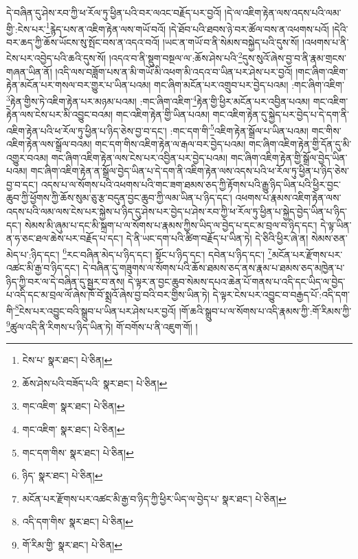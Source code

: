 དེ་བཞིན་དུ་ཤེས་རབ་ཀྱི་ཕ་རོལ་ཏུ་ཕྱིན་པའི་བར་ལའང་བརྗོད་པར་བྱའོ། །དེ་ལ་འཇིག་རྟེན་ལས་འདས་པའི་ལམ་གྱི་:ངེས་པར་\footnote{ངེས་པ་  སྣར་ཐང་།  པེ་ཅིན། }རྙེད་པས་ན་འཇིག་རྟེན་ལས་གཡོ་བའོ། །དེ་ཐོབ་པའི་ཐབས་ཉེ་བར་ཚོལ་བས་ན་འཕགས་པའོ། །དེའི་བར་ཆད་ཀྱི་ཆོས་ཡོངས་སུ་སྤོང་བས་ན་འདའ་བའོ། །ཡང་ན་གཡོ་བ་ནི་སེམས་བསྐྱེད་པའི་དུས་སོ། །འཕགས་པ་ནི་ངེས་པར་འབྱེད་པའི་ཆའི་དུས་སོ། །འདའ་བ་ནི་སྡུག་བསྔལ་ལ་:ཆོས་ཤེས་པའི་\footnote{ཆོས་ཤེས་པའི་བཟོད་པའི་  སྣར་ཐང་།  པེ་ཅིན། }དུས་སུའོ་ཞེས་བྱ་བ་ནི་རྣམ་གྲངས་གཞན་ཡིན་ནོ། །འདི་ལས་བཟློག་པས་ན་མི་གཡོ་མི་འཕག་མི་འདའ་བ་ཡིན་པར་ཤེས་པར་བྱའོ། །གང་ཞིག་འཇིག་རྟེན་མངོན་པར་གསལ་བར་གྱུར་པ་ཡིན་པའམ། གང་ཞིག་མངོན་པར་འགྲུབ་པར་བྱེད་པའམ། :གང་ཞིག་འཇིག་\footnote{གང་འཇིག་  སྣར་ཐང་།  པེ་ཅིན། }རྟེན་གྱིས་ཏེ་འཇིག་རྟེན་པར་མཉམ་པའམ། :གང་ཞིག་འཇིག་\footnote{གང་འཇིག་  སྣར་ཐང་།  པེ་ཅིན། }རྟེན་གྱི་ཕྱིར་མངོན་པར་འབྱིན་པའམ། གང་འཇིག་རྟེན་ལས་ངེས་པར་མི་འབྱུང་བའམ། གང་འཇིག་རྟེན་གྱི་ཡིན་པའམ། གང་འཇིག་རྟེན་དུ་སྐྱེད་པར་བྱེད་པ་དེ་དག་ནི་འཇིག་རྟེན་པའི་ཕ་རོལ་ཏུ་ཕྱིན་པ་ཉིད་ཅེས་བྱ་བ་དང་། :གང་དག་གི་\footnote{གང་དག་གིས་  སྣར་ཐང་།  པེ་ཅིན། }འཇིག་རྟེན་སྒྲོལ་པ་ཡིན་པའམ། གང་གིས་འཇིག་རྟེན་ལས་སྒྲོལ་བའམ། གང་དག་གིས་འཇིག་རྟེན་ལ་རྒལ་བར་བྱེད་པའམ། གང་ཞིག་འཇིག་རྟེན་གྱི་དོན་དུ་མི་འགྱུར་བའམ། གང་ཞིག་འཇིག་རྟེན་ལས་ངེས་པར་འབྱིན་པར་བྱེད་པའམ། གང་ཞིག་འཇིག་རྟེན་གྱི་སྒྲོལ་བྱེད་ཡིན་པའམ། གང་ཞིག་འཇིག་རྟེན་ན་སྒྲོལ་བྱེད་ཡིན་པ་དེ་དག་ནི་འཇིག་རྟེན་ལས་འདས་པའི་ཕ་རོལ་ཏུ་ཕྱིན་པ་ཉིད་ཅེས་བྱ་བ་དང་། འདས་པ་ལ་སོགས་པའི་འཕགས་པའི་གང་ཟག་ཐམས་ཅད་ཀྱི་རྟོགས་པའི་རྒྱུ་ཉིད་ཡིན་པའི་ཕྱིར་བྱང་ཆུབ་ཀྱི་ཕྱོགས་ཀྱི་ཆོས་སུམ་ཅུ་རྩ་བདུན་བྱང་ཆུབ་ཀྱི་ལམ་ཡིན་པ་ཉིད་དང་། འཕགས་པ་རྣམས་འཇིག་རྟེན་ལས་འདས་པའི་ལམ་ལས་ངེས་པར་སྐྱེས་པ་ཉིད་དུ་ཤེས་པར་བྱེད་པ་ཤེས་རབ་ཀྱི་ཕ་རོལ་ཏུ་ཕྱིན་པ་སྐྱེད་བྱེད་ཡིན་པ་ཉིད་དང་། སེམས་མི་ཞུམ་པ་དང་མི་སྐྲག་པ་ལ་སོགས་པ་རྣམས་ཀྱིས་ཡིད་ལ་བྱེད་པ་དང་མ་བྲལ་བ་ཉིད་དང་། དེ་ལྟ་ཡིན་ན་ཧ་ཅང་ཐལ་ཆེས་པར་བརྗོད་པ་དང་། དེ་ནི་ཡང་དག་པའི་ཚིག་བརྗོད་པ་ཡིན་ཏེ། དེ་ཅིའི་ཕྱིར་ཞེ་ན། སེམས་ཅན་མེད་པ་:ཉིད་དང་། \footnote{ཉིད་  སྣར་ཐང་།  པེ་ཅིན། }རང་བཞིན་མེད་པ་ཉིད་དང་། སྟོང་པ་ཉིད་དང་། དབེན་པ་ཉིད་དང་། \footnote{མངོན་པར་རྫོགས་པར་འཚང་མི་རྒྱ་བ་ཉིད་ཀྱི་ཕྱིར་ཡིད་ལ་བྱེད་པ་  སྣར་ཐང་།  པེ་ཅིན། }མངོན་པར་རྫོགས་པར་འཚང་མི་རྒྱ་བ་ཉིད་དང་། དེ་བཞིན་དུ་གཟུགས་ལ་སོགས་པའི་ཆོས་ཐམས་ཅད་ནས་རྣམ་པ་ཐམས་ཅད་མཁྱེན་པ་ཉིད་ཀྱི་བར་ལ་དེ་བཞིན་དུ་སྦྱར་བ་ནས། དེ་ལྟར་ན་བྱང་ཆུབ་སེམས་དཔའ་ཆེན་པོ་གནས་པ་འདི་དང་ཡིད་ལ་བྱེད་པ་འདི་དང་མ་བྲལ་ལོ་ཞེས་ཁོ་བོ་སྨྲའོ་ཞེས་བྱ་བའི་བར་གྱིས་ཡིན་ཏེ། དེ་ལྟར་ངེས་པར་འབྱུང་བ་བརྒྱད་པོ་:འདི་དག་གི་\footnote{འདི་དག་གིས་  སྣར་ཐང་།  པེ་ཅིན། }ངེས་པར་འབྱུང་བའི་སྒྲུབ་པ་ཡིན་པར་ཤེས་པར་བྱའོ། །གོ་ཆའི་སྒྲུབ་པ་ལ་སོགས་པ་འདི་རྣམས་ཀྱི་:གོ་རིམས་ཀྱི་\footnote{གོ་རིམ་གྱི་  སྣར་ཐང་།  པེ་ཅིན། }ཚུལ་འདི་ནི་རིགས་པ་ཉིད་ཡིན་ཏེ། གོ་བགོས་པ་ནི་འཇུག་གོ། །
